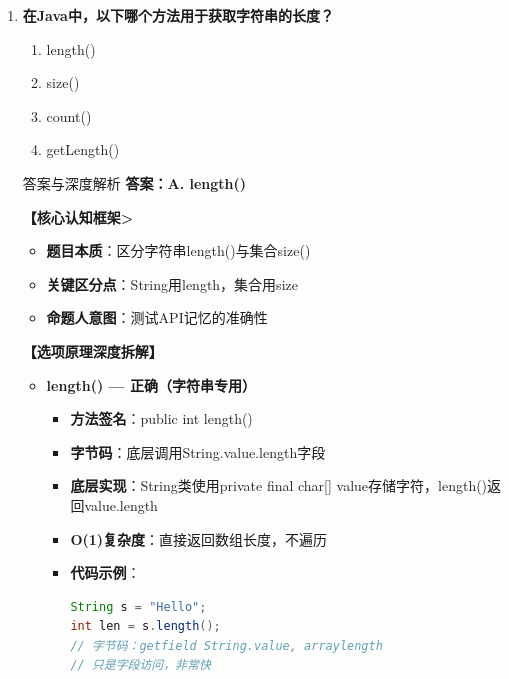 \documentclass[12pt, a4paper]{ctexart}
\begin{document}
\begin{enumerate}[label=\textbf{\arabic*.}]
\begin{bluebox}{答案与深度解析}
		      \textbf{【命题趋势与实战策略】}

		      \textbf{考场秒杀}：看到"字符串转整数"→选parseInt()
		      \textbf{陷阱清单}：valueOf返回对象，需再调intValue()才得int
	      \end{bluebox}

	      \vspace{1em}

	\item \textbf{在Java中，以下哪个方法用于获取字符串的长度？}
	      \begin{enumerate}[label=\Alph*.]
		      \item length()
		      \item size()
		      \item count()
		      \item getLength()
	      \end{enumerate}

	      \begin{bluebox}{答案与深度解析}
		      \textbf{答案：A. length()}

		      \textbf{【核心认知框架>}
		      \begin{itemize}[label={}, leftmargin=*, nosep]
			      \item \textbf{题目本质}：区分字符串length()与集合size()
			      \item \textbf{关键区分点}：String用length，集合用size
			      \item \textbf{命题人意图}：测试API记忆的准确性
		      \end{itemize}

		      \textbf{【选项原理深度拆解】}

		      \begin{itemize}[leftmargin=*, nosep, label={}]
			      \item[A] \textbf{length() — 正确（字符串专用）}
			            \begin{itemize}[label={}, leftmargin=*, nosep]
				            \item \textbf{方法签名}：public int length()
				            \item \textbf{字节码}：底层调用String.value.length字段
				            \item \textbf{底层实现}：String类使用private final char[] value存储字符，length()返回value.length
				            \item \textbf{O(1)复杂度}：直接返回数组长度，不遍历
				            \item \textbf{代码示例}：
				                  \begin{lstlisting}[language=Java]
String s = "Hello";
int len = s.length();
// 字节码：getfield String.value, arraylength
// 只是字段访问，非常快
				            \end{lstlisting}
			            \end{itemize}


\end{itemize}
\end{bluebox}
\end{enumerate}
\end{document}
